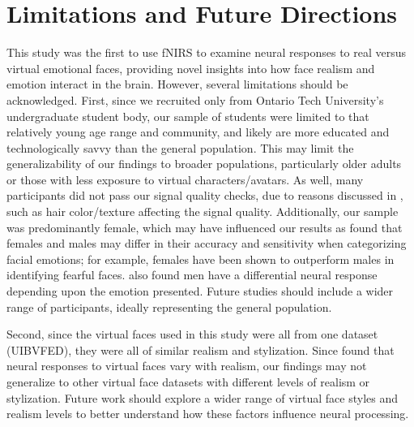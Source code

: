\section{Limitations and Future Directions}
This study was the first to use fNIRS to examine neural responses to real versus virtual emotional faces, providing novel insights into how face realism and emotion interact in the brain.
However, several limitations should be acknowledged.
First, since we recruited only from Ontario Tech University's undergraduate student body, our sample of students were limited to that relatively young age range and community, and likely are more educated and technologically savvy than the general population.
This may limit the generalizability of our findings to broader populations, particularly older adults or those with less exposure to virtual characters/avatars.
As well, many participants did not pass our signal quality checks, due to reasons discussed in \cite{holmes_opening_2024}, such as hair color/texture affecting the signal quality. 
Additionally, our sample was predominantly female, which may have influenced our results as \cite{weisenbach_reduced_2014} found that females and males may differ in their accuracy and sensitivity when categorizing facial emotions; for example, females have been shown to outperform males in identifying fearful faces.
\cite{keslerwest_neural_2001} also found men have a differential neural response depending upon the emotion presented. 
Future studies should include a wider range of participants, ideally representing the general population. 

Second, since the virtual faces used in this study were all from one dataset (UIBVFED), they were all of similar realism and stylization.
Since \cite{schindler_differential_2017} found that neural responses to virtual faces vary with realism, our findings may not generalize to other virtual face datasets with different levels of realism or stylization. 
Future work should explore a wider range of virtual face styles and realism levels to better understand how these factors influence neural processing.

